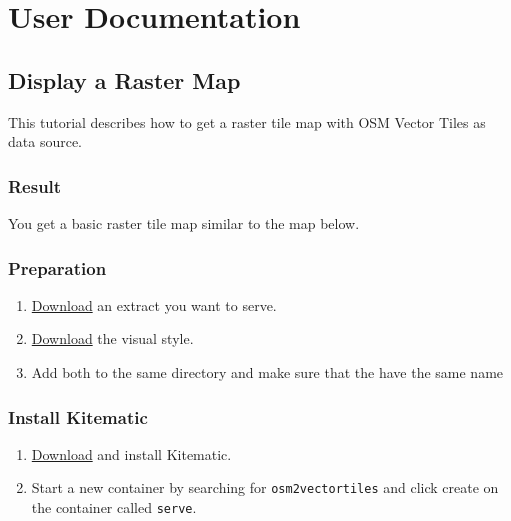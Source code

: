 \chapter{User Documentation}

\section{Display a Raster Map}

This tutorial describes how to get a raster tile map with OSM Vector
Tiles as data source.

\subsection{Result}

You get a basic raster tile map similar to the map below.

\hypertarget{osm-bright-map}{}

\subsection{Preparation}

\begin{enumerate}
\item
  \href{http://osm2vectortiles.org/data/download.html}{Download} an
  extract you want to serve.
\item
  \href{https://github.com/mapbox/mapbox-studio-osm-bright.tm2.git}{Download}
  the visual style.
\item
  Add both to the same directory and make sure that the have the same
  name
\end{enumerate}

\subsection{Install Kitematic}

\begin{enumerate}
\item
  \href{https://www.docker.com/docker-toolbox}{Download} and install
  Kitematic.
\item
  Start a new container by searching for \texttt{osm2vectortiles} and
  click create on the container called \texttt{serve}.
\end{enumerate}

